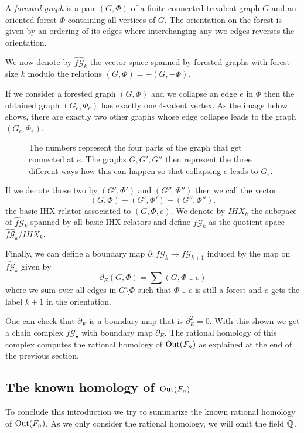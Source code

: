 \begin{definition}
	A \emph{forested graph} is a pair $(G,\Phi)$ of a finite connected trivalent graph $G$ and an oriented forest $\Phi$ containing all vertices of $G$.
	The orientation on the forest is given by an ordering of its edges where interchanging any two edges reverses the orientation.
\end{definition}

We now denote by $\widehat{f\mathcal{G}}_{k}$ the vector space spanned by forested graphs with forest size $k$ modulo the relations
$(G,\Phi) = -(G,-\Phi)$.

If we consider a forested graph $(G,\Phi)$ and we collapse an edge $e$ in $\Phi$ then the obtained graph $(G_{e},\Phi_{e})$ 
has exactly one $4$-valent vertex. As the image below shows, there are exactly two other graphs
whose edge collapse leads to the graph $(G_{e},\Phi_{e})$.

\begin{figure}[bh]
	\centering
	\captionsetup{width=0.8\textwidth}
	\caption{The numbers represent the four parts of the graph that get connected at $e$.
		The graphs $G,G',G''$ then represent the three different ways how this can happen so that
	collapsing $e$ leads to $G_{e}$.}
\end{figure}

If we denote those two by $(G',\Phi')$ and  $(G'',\Phi'')$ then we call the vector
\[
	(G,\Phi) + (G',\Phi') + (G'',\Phi'')
.\] 
the basic IHX relator associated to $(G,\Phi,e)$. 
We denote by $IHX_{k}$ the subspace of $\widehat{f\mathcal{G}}_{k}$ spanned by all basic IHX relators
and define $f\mathcal{G}_{k}$ as the quotient space $\widehat{f\mathcal{G}}_{k} / IHX_{k}$.

Finally, we can define a boundary map  $\partial: f\mathcal{G}_{k} \to f\mathcal{G}_{k+1}$ induced by the map on $\widehat{f \mathcal{G}}_{k}$ given by
\[
	\partial_{E}(G,\Phi) = \sum (G,\Phi \cup e)
\] 
where we sum over all edges in $G \setminus \Phi$ such that $\Phi \cup e$ is still a forest and 
$e$ gets the label $k+1$ in the orientation.

One can check that $\partial_{E}$ is a boundary map that is $\partial_{E}^2 = 0$.
With this shown we get a chain complex $f\mathcal{G}_{\bullet}$ with boundary map $\partial_{E}$.
The rational homology of this complex computes the rational homology of $\operatorname{Out}(F_{n})$ as
explained at the end of the previous section.

\subsection{The known homology of \texorpdfstring{\boldmath$\operatorname{Out}(F_{n})$}{Out(Fn)}}
To conclude this introduction we try to summarize the known rational homology of $\operatorname{Out}(F_{n})$.
As we only consider the rational homology, we will omit the field $\mathbb{Q}$.

